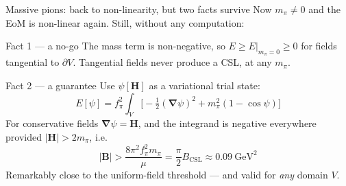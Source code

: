 \documentclass[aspectratio=169,10pt]{beamer}
\newcommand{\B}{\bm{B}}
\newcommand{\Hb}{\bm{H}}
\newcommand{\gr}{\bm{\nabla}}
\newcommand{\fpi}{f_\pi}
\newcommand{\mpi}{m_\pi}
\newcommand{\Bcsl}{B_{\mathrm{CSL}}}
\begin{document}
\begin{frame}{Massive pions: back to non-linearity, but two facts survive}
Now $\mpi\neq0$ and the EoM is non-linear again. Still, without any computation:
\vspace{1mm}
\begin{block}{Fact 1 --- a no-go}
The mass term is non-negative, so $E\ge E|_{\mpi=0}\ge0$ for fields tangential
to $\partial V$. \alert{Tangential fields never produce a CSL, at any $\mpi$.}
\end{block}
\begin{block}{Fact 2 --- a guarantee}
Use $\psi[\Hb]$ as a variational trial state:
\[
 E[\psi]=\fpi^2\!\int_V\Big[-\tfrac12(\gr\psi)^2+\mpi^2(1-\cos\psi)\Big]
\]
For conservative fields $\gr\psi=\Hb$, and the integrand is negative everywhere
provided $|\Hb|>2\mpi$, i.e.
\[
 \boxed{\ |\B|>\frac{8\pi^2\fpi^2\mpi}{\mu}=\frac{\pi}{2}\Bcsl\approx0.09\ \text{GeV}^2\ }
\]
\centering \alert{Remarkably close to the uniform-field threshold} --- and valid
for \emph{any} domain $V$.
\end{block}
\end{frame}
\end{document}
